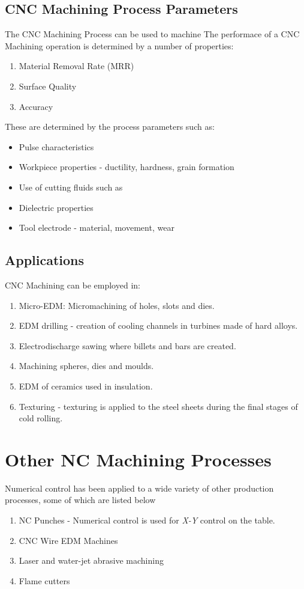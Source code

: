 \subsection{CNC Machining Process Parameters}
The CNC Machining Process can be used to machine
The performace of a CNC Machining operation is determined by a number of properties:
\begin{enumerate}
	\item Material Removal Rate (MRR)
	\item Surface Quality
	\item Accuracy
\end{enumerate}
These are determined by the process parameters such as:
\begin{itemize}
	\item Pulse characteristics
	\item Workpiece properties - ductility, hardness, grain formation
	\item Use of cutting fluids such as 
	\item Dielectric properties
	\item Tool electrode - material, movement, wear
\end{itemize}

\subsection{Applications}
CNC Machining can be employed in:
\begin{enumerate}
	\item Micro-EDM: Micromachining of holes, slots and dies.
	\item EDM drilling - creation of cooling channels in turbines made of hard alloys.
	\item Electrodischarge sawing where billets and bars are created.
	\item Machining spheres, dies and moulds.
	\item EDM of ceramics used in insulation.
	\item Texturing - texturing is applied to the steel sheets during the final stages of cold rolling.
\end{enumerate}
\section{Other NC Machining Processes}
Numerical control has been applied to a wide variety of other production processes\cite{Black2011}, some of which are listed below
\begin{enumerate}
	\item NC Punches - Numerical control is used for \textit{X-Y} control on the table.
	\item CNC Wire EDM Machines
	\item Laser and water-jet abrasive machining
	\item Flame cutters
\end{enumerate}
